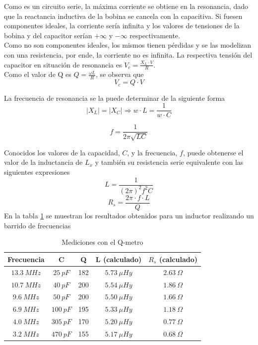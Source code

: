 \documentclass[a4paper,10pt]{article}
\begin{document}
		\indent Como es un circuito serie, la máxima corriente se obtiene en 
		la resonancia, dado que la reactancia inductiva de la bobina se 
		cancela con la capacitiva. Si fuesen componentes ideales, la corriente
		sería infinita y los valores de tensiones de la bobina y del capacitor
		serían $+\infty$ y $-\infty$ respectivamente. \\
		\indent Como no son componentes ideales, los mismos tienen pérdidas y
		se las modelizan con una resistencia, por ende, la corriente no es 
		infinita. La respectiva tensión del capacitor en situación de 
		resonancia es $V_c = \frac{X_L\cdot V}{R}$. \\
		\indent Como el valor de Q es $Q=\frac{\omega L}{R}$, se observa que 
		$$V_c = Q \cdot V$$

		\indent La frecuencia de resonancia se la puede determinar de la 
		siguiente forma
		$$|X_L|=|X_C| \Rightarrow w\cdot L = \frac{1}{w\cdot C}$$

		$$f=\frac{1}{2\pi\sqrt{LC}}$$ 
		
		\indent Conocidos los valores de la capacidad, $C$, y la frecuencia, 
		$f$, puede obtenerse el valor de la inductancia de $L_x$ y tambi\'en 
		su resistencia serie equivalente con las siguientes expresiones
		$$L=\frac{1}{(2\pi)^2 f^2C}$$
		$$R_s=\frac{2\pi\cdot f\cdot L}{Q}$$
		\indent En la tabla \ref{tab001} se muestran los resultados obtenidos
		para un inductor realizando un barrido de frecuencias
		
		\begin{table}[!htp]
					\centering
					\begin{tabular}{|c|c|c|c|c|}
						\hline
			    		Frecuencia & C & Q & L (calculado) & $R_s$ (calculado) \\
						\hline
						$13.3~MHz$& $25~pF$& 182 & $5.73~\mu Hy$ &$ 2.63~\Omega$ \\
						\hline
						$10.7~MHz$& $40~pF$& 200 & $5.54~\mu Hy$ &$ 1.86~\Omega$ \\
						\hline
						$9.6~MHz$& $50~pF$& 200 & $5.50~\mu Hy$ &$ 1.66~\Omega$ \\
						\hline  
						$6.9~MHz$& $100~pF$& 195 & $5.33~\mu Hy$ &$ 1.18~\Omega$ \\
						\hline  										
						$4.0~MHz$& $305~pF$& 170 & $5.20~\mu Hy$ &$ 0.77~\Omega$ \\
						\hline
						$3.2~MHz$& $470~pF$& 155 & $5.17~\mu Hy$ &$ 0.68~\Omega$ \\
						\hline  						  	  
					\end{tabular}
					\caption{Mediciones con el Q-metro} \label{tab001}
				\end{table}
\end{document}

